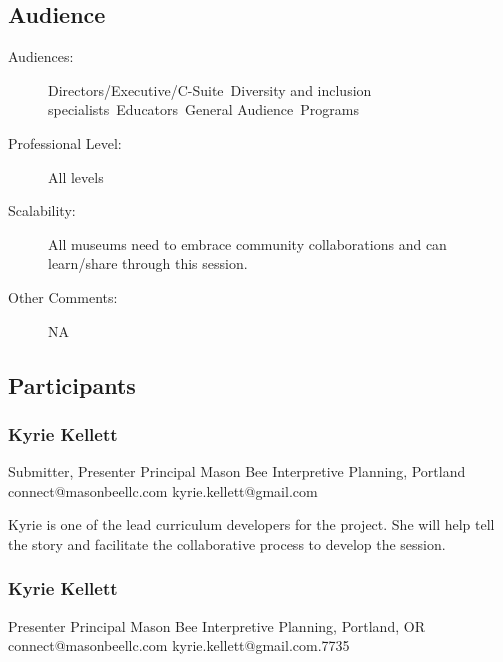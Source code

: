 \documentclass{report}
\begin{document}
              \subsection*{Audience}
                \begin{description}
                  \item [Audiences:]Directors/Executive/C-Suite~Diversity and inclusion specialists~Educators~General Audience~Programs~
                  \item[Professional Level:]All levels~
                \item[Scalability:] All museums need to embrace community collaborations and can learn/share through this session.

							
              \item[Other Comments:] NA
              \end{description}
            \subsection*{Participants}
              \subsubsection*{ Kyrie Kellett }
              Submitter, Presenter\newline
              Principal\newline
              Mason Bee Interpretive Planning, Portland
              \newline
              connect@masonbeellc.com\newline
              kyrie.kellett@gmail.com\newline

              Kyrie is one of the lead curriculum developers for the project. She will help tell the story and facilitate the collaborative process to develop the session.\newline


              

              
                \subsubsection*{ Kyrie Kellett }
                Presenter\newline
                Principal\newline
                Mason Bee Interpretive Planning, Portland, OR
                \newline
                connect@masonbeellc.com\newline
                kyrie.kellett@gmail.com.7735\newline
\end{document}
